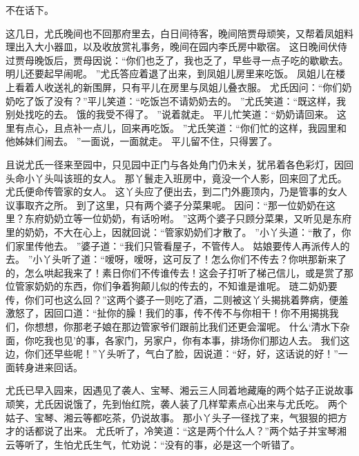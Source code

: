 不在话下。
\par
这几日，尤氏晚间也不回那府里去，白日间待客，晚间陪贾母顽笑，又帮着凤姐料理出入大小器皿，以及收放赏礼事务，晚间在园内李氏房中歇宿。
这日晚间伏侍过贾母晚饭后，贾母因说：“你们也乏了，我也乏了，早些寻一点子吃的歇歇去。
明儿还要起早闹呢。
”尤氏答应着退了出来，到凤姐儿房里来吃饭。
凤姐儿在楼上看着人收送礼的新围屏，只有平儿在房里与凤姐儿叠衣服。
尤氏因问：“你们奶奶吃了饭了没有？”平儿笑道：“吃饭岂不请奶奶去的。
”尤氏笑道：“既这样，我别处找吃的去。
饿的我受不得了。
”说着就走。
平儿忙笑道：“奶奶请回来。
这里有点心，且点补一点儿，回来再吃饭。
”尤氏笑道：“你们忙的这样，我园里和他姊妹们闹去。
”一面说，一面就走。
平儿留不住，只得罢了。
\par
且说尤氏一径来至园中，只见园中正门与各处角门仍未关，犹吊着各色彩灯，因回头命小丫头叫该班的女人。
那丫鬟走入班房中，竟没一个人影，回来回了尤氏。
尤氏便命传管家的女人。
这丫头应了便出去，到二门外鹿顶内，乃是管事的女人议事取齐之所。
到了这里，只有两个婆子分菜果呢。
因问：“那一位奶奶在这里？东府奶奶立等一位奶奶，有话吩咐。
”这两个婆子只顾分菜果，又听见是东府里的奶奶，不大在心上，因就回说：“管家奶奶们才散了。
”小丫头道：“散了，你们家里传他去。
”婆子道：“我们只管看屋子，不管传人。
姑娘要传人再派传人的去。
”小丫头听了道：“嗳呀，嗳呀，这可反了！怎么你们不传去？你哄那新来了的，怎么哄起我来了！素日你们不传谁传去！这会子打听了梯己信儿，或是赏了那位管家奶奶的东西，你们争着狗颠儿似的传去的，不知谁是谁呢。
琏二奶奶要传，你们可也这么回？”这两个婆子一则吃了酒，二则被这丫头揭挑着弊病，便羞激怒了，因回口道：“扯你的臊！我们的事，传不传不与你相干！你不用揭挑我们，你想想，你那老子娘在那边管家爷们跟前比我们还更会溜呢。
什么‘清水下杂面，你吃我也见’的事，各家门，另家户，你有本事，排场你们那边人去。
我们这边，你们还早些呢！”丫头听了，气白了脸，因说道：“好，好，这话说的好！”一面转身进来回话。
\par
尤氏已早入园来，因遇见了袭人、宝琴、湘云三人同着地藏庵的两个姑子正说故事顽笑，尤氏因说饿了，先到怡红院，袭人装了几样荤素点心出来与尤氏吃。
两个姑子、宝琴、湘云等都吃茶，仍说故事。
那小丫头子一径找了来，气狠狠的把方才的话都说了出来。
尤氏听了，冷笑道：“这是两个什么人？”两个姑子并宝琴湘云等听了，生怕尤氏生气，忙劝说：“没有的事，必是这一个听错了。
